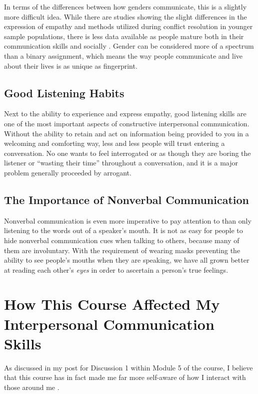     In terms of the differences between how genders communicate, this is a
      slightly more difficult idea. While there are studies showing the
      slight differences in the expression of empathy and methods utilized
      during conflict resolution in younger sample populations, there is less
      data available as people mature both in their communication skills and
      socially \parencite[pp. 51]{wied_empathy_2007}. Gender can be considered
      more of a spectrum than a binary assignment, which means the way people
      communicate and live about their lives is as unique as fingerprint.

  \subsection{Good Listening Habits}
    Next to the ability to experience and express empathy, good listening
      skills are one of the most important aspects of constructive interpersonal
      communication. Without the ability to retain and act on information being
      provided to you in a welcoming and comforting way, less and less people
      will trust entering a conversation. No one wants to feel interrogated
      or as though they are boring the listener or ``wasting their time''
      throughout a conversation, and it is a major problem generally proceeded
      by arrogant.

  \subsection{The Importance of Nonverbal Communication}
    Nonverbal communication is even more imperative to pay attention to than
      only listening to the words out of a speaker's mouth. It is not as easy
      for people to hide nonverbal communication cues when talking to others,
      because many of them are involuntary. With the requirement of wearing
      masks preventing the ability to see people's mouths when they are
      speaking, we have all grown better at reading each other's \textit{eyes}
      in order to ascertain a person's true feelings.


\section{How This Course Affected My Interpersonal Communication Skills}
  As discussed in my post for Discussion 1 within Module 5 of the course, I
    believe that this course has in fact made me far more self-aware of how I
    interact with those around me \parencite{hellwig_m5d2_2020}.
